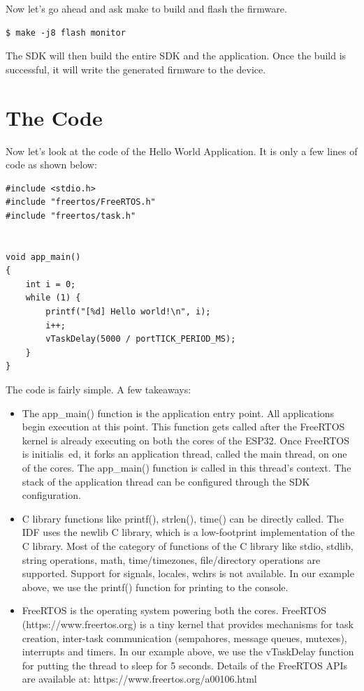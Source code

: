 \documentclass[main.tex]{subfiles}
\begin{document}
Now let's go ahead and ask make to build and flash the firmware.
\begin{verbatim}
$ make -j8 flash monitor
\end{verbatim}

The SDK will then build the entire SDK and the application. Once the build is successful, it will write the generated firmware to the device.


\section{The Code}
Now let's look at the code of the Hello World Application. It is only a few lines of code as shown below:
\begin{verbatim}
#include <stdio.h>
#include "freertos/FreeRTOS.h"
#include "freertos/task.h"


void app_main()
{
    int i = 0;
    while (1) {
        printf("[%d] Hello world!\n", i);
        i++;
        vTaskDelay(5000 / portTICK_PERIOD_MS);
    }
}
\end{verbatim}
The code is fairly simple. A few takeaways:
\begin{itemize}
\item The app\_main() function is the application entry point. All applications begin execution at this point. This function gets called after the FreeRTOS kernel is already executing on both the cores of the ESP32. Once FreeRTOS is initialis\
ed, it forks an application thread, called the main thread, on one of the cores. The app\_main() function is called in this thread's context. The stack of the application thread can be configured through the SDK configuration.
\item C library functions like printf(), strlen(), time() can be directly called. The IDF uses the newlib C library, which is a low-footprint implementation of the C library. Most of the category of functions of the C library like stdio, stdlib, string operations, math, time/timezones, file/directory operations are supported. Support for signals, locales, wchrs is not available. In our example above, we use the printf() function for printing to the console.
\item FreeRTOS is the operating system powering both the cores. FreeRTOS (https://www.freertos.org) is a tiny kernel that provides mechanisms for task creation, inter-task communication (sempahores, message queues, mutexes), interrupts and timers. In our example above, we use the vTaskDelay function for putting the thread to sleep for 5 seconds. Details of the FreeRTOS APIs are available at: https://www.freertos.org/a00106.html
\end{itemize}
\end{document}
